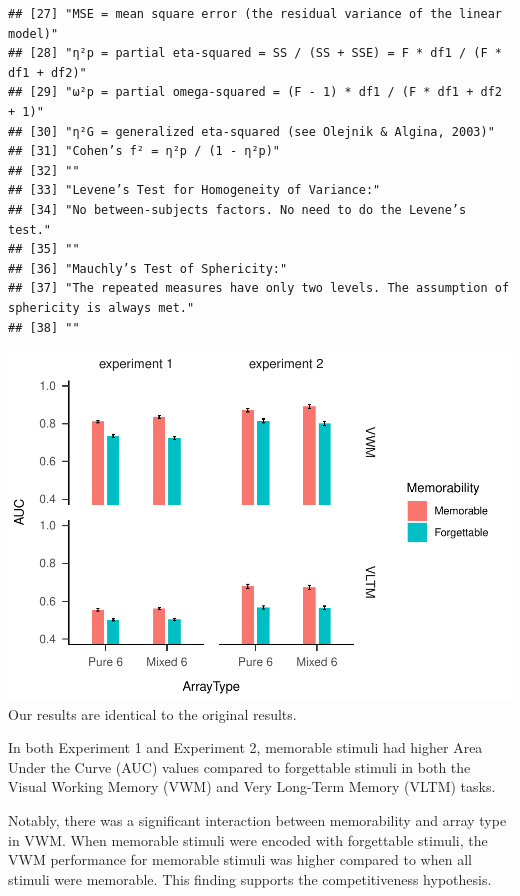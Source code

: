 \documentclass[
  man]{apa6}
\begin{document}
\begin{verbatim}
## [27] "MSE = mean square error (the residual variance of the linear model)"                    
## [28] "η²p = partial eta-squared = SS / (SS + SSE) = F * df1 / (F * df1 + df2)"                
## [29] "ω²p = partial omega-squared = (F - 1) * df1 / (F * df1 + df2 + 1)"                      
## [30] "η²G = generalized eta-squared (see Olejnik & Algina, 2003)"                             
## [31] "Cohen’s f² = η²p / (1 - η²p)"                                                           
## [32] ""                                                                                       
## [33] "Levene’s Test for Homogeneity of Variance:"                                             
## [34] "No between-subjects factors. No need to do the Levene’s test."                          
## [35] ""                                                                                       
## [36] "Mauchly’s Test of Sphericity:"                                                          
## [37] "The repeated measures have only two levels. The assumption of sphericity is always met."
## [38] ""
\end{verbatim}

\includegraphics{Script_Re_Greer_2023_group1Rock_2023_files/figure-latex/plot for competitive hypothesis-1.pdf}
Our results are identical to the original results.

In both Experiment 1 and Experiment 2, memorable stimuli had higher Area Under the Curve (AUC) values compared to forgettable stimuli in both the Visual Working Memory (VWM) and Very Long-Term Memory (VLTM) tasks.

Notably, there was a significant interaction between memorability and array type in VWM. When memorable stimuli were encoded with forgettable stimuli, the VWM performance for memorable stimuli was higher compared to when all stimuli were memorable. This finding supports the competitiveness hypothesis.
\end{document}
